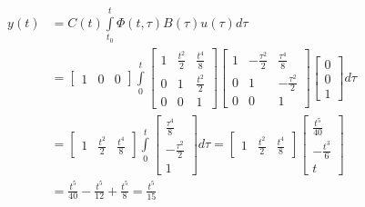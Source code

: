 \documentclass[twoside]{article}
\begin{document}
\begin{align*}
	y(t) &= C(t) \int\limits_{t_0}^{t} \Phi(t , \tau) B(\tau) u(\tau) d\tau 
	\\
	&= \begin{bmatrix} 1 & 0 & 0 \end{bmatrix}  \int\limits_{0}^{t} \begin{bmatrix} 1 & \frac{t^2}{2} & \frac{t^4}{8} \\ 0 & 1 & \frac{t^2}{2} \\ 0 & 0 & 1 \end{bmatrix} 
	\begin{bmatrix} 1 & -\frac{\tau^2}{2} & \frac{\tau^4}{8}  \\ 0 & 1 & -\frac{\tau^2}{2} \\ 0 & 0 & 1 \end{bmatrix} \begin{bmatrix} 0 \\ 0 \\ 1 \end{bmatrix}  d\tau 
	\\
	&= \begin{bmatrix} 1 & \frac{t^2}{2} & \frac{t^4}{8} \end{bmatrix}  \int\limits_{0}^{t} \begin{bmatrix} \frac{\tau^4}{8} \\ -\frac{\tau^2}{2} \\ 1 \end{bmatrix} d\tau 
	= \begin{bmatrix} 1 & \frac{t^2}{2} & \frac{t^4}{8} \end{bmatrix} \begin{bmatrix} \frac{t^5}{40} \\ -\frac{t^3}{6} \\ t \end{bmatrix} 
	\\
	&= \frac{t^5}{40} - \frac{t^5}{12} + \frac{t^5}{8} = \frac{t^5}{15}
\end{align*}
\end{document}
